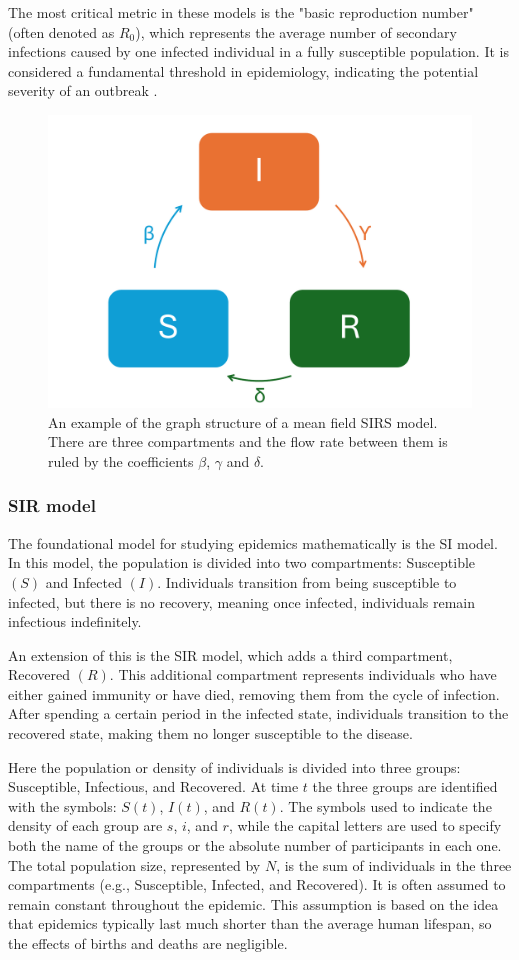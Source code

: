 The most critical metric in these models is the "basic reproduction number" (often denoted as $R_0$), which represents the average number of secondary infections caused by one infected individual in a fully susceptible population. It is considered a fundamental threshold in epidemiology, indicating the potential severity of an outbreak \cite{Hernandez_Vargas_2022}. 
\begin{figure}[]
	\centering
	\includegraphics[width=0.65\linewidth]{0_introduction/images_introduction/SIRS_figure_compartmental}
	\caption[SIRS example]{An example of the graph structure of a mean field SIRS model. There are three compartments and the flow rate between them is ruled by the coefficients $\beta$, $\gamma$ and $\delta$.}
	\label{fig:sirsfigurecompartmental}
\end{figure}


\subsubsection{SIR model}
\label{subsec:SIR}
The foundational model for studying epidemics mathematically is the SI model. In this model, the population is divided into two compartments: Susceptible $(S)$ and Infected $(I)$. Individuals transition from being susceptible to infected, but there is no recovery, meaning once infected, individuals remain infectious indefinitely.

An extension of this is the SIR model, which adds a third compartment, Recovered $(R)$. This additional compartment represents individuals who have either gained immunity or have died, removing them from the cycle of infection. After spending a certain period in the infected state, individuals transition to the recovered state, making them no longer susceptible to the disease.

  Here the population or density of individuals is divided into three groups: Susceptible, Infectious, and Recovered. At time $t$ the three groups are identified with the symbols: $S(t)$, $I(t)$, and $R(t)$. 
The symbols used to indicate the density of each group are $s$, $i$, and $r$, while the capital letters are used to specify both the name of the groups or the absolute number of participants in each one. 
The total population size, represented by $N$, is the sum of individuals in the three compartments (e.g., Susceptible, Infected, and Recovered). It is often assumed to remain constant throughout the epidemic. This assumption is based on the idea that epidemics typically last much shorter than the average human lifespan, so the effects of births and deaths are negligible.

